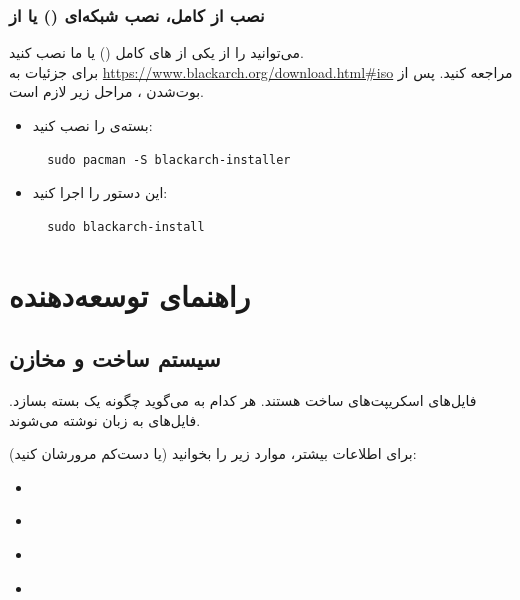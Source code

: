 \documentclass[a4paper, oneside, 11pt]{book}
\begin{document}
\subsection{نصب از  کامل،  نصب شبکه‌ای () یا از }
می‌توانید  را از یکی از های کامل () یا  ما
نصب کنید.\\برای جزئیات به \url{https://www.blackarch.org/download.html#iso}
مراجعه کنید. پس از بوت‌شدن ، مراحل زیر لازم است.
\begin{itemize}
\item بسته‌ی  را نصب کنید:
\begin{latin}
\begin{lstlisting}
  sudo pacman -S blackarch-installer
\end{lstlisting}
\end{latin}

\item این دستور را اجرا کنید:
\begin{latin}
\begin{lstlisting}
  sudo blackarch-install
\end{lstlisting}
\end{latin}

\end{itemize}


\chapter{راهنمای توسعه‌دهنده}

\section{سیستم ساخت و مخازن }

فایل‌های  اسکریپت‌های ساخت هستند. هر کدام به  می‌گوید
چگونه یک بسته بسازد. فایل‌های  به زبان  نوشته می‌شوند.

برای اطلاعات بیشتر، موارد زیر را بخوانید (یا دست‌کم مرورشان کنید):
\begin{itemize}
\item \href{https://wiki.archlinux.org/index.php/Creating_Packages}{}
\item \href{https://wiki.archlinux.org/index.php/Makepkg}{}
\item \href{https://wiki.archlinux.org/index.php/PKGBUILD}{}
\item \href{https://wiki.archlinux.org/index.php/Arch_Packaging_Standards}{}
\end{itemize}
\end{document}
